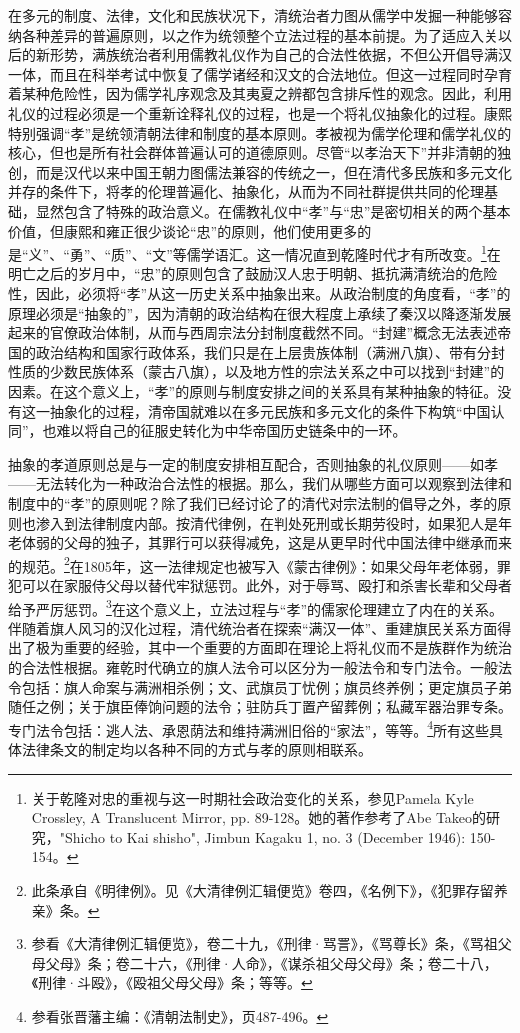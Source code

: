 \documentclass[a4paper, 12pt, openright]{ctexbook}
\begin{document}
在多元的制度、法律，文化和民族状况下，清统治者力图从儒学中发掘一种能够容纳各种差异的普遍原则，以之作为统领整个立法过程的基本前提。为了适应入关以后的新形势，满族统治者利用儒教礼仪作为自己的合法性依据，不但公开倡导满汉一体，而且在科举考试中恢复了儒学诸经和汉文的合法地位。但这一过程同时孕育着某种危险性，因为儒学礼序观念及其夷夏之辨都包含排斥性的观念。因此，利用礼仪的过程必须是一个重新诠释礼仪的过程，也是一个将礼仪抽象化的过程。康熙特别强调“孝”是统领清朝法律和制度的基本原则。孝被视为儒学伦理和儒学礼仪的核心，但也是所有社会群体普遍认可的道德原则。尽管“以孝治天下”并非清朝的独创，而是汉代以来中国王朝力图儒法兼容的传统之一，但在清代多民族和多元文化并存的条件下，将孝的伦理普遍化、抽象化，从而为不同社群提供共同的伦理基础，显然包含了特殊的政治意义。在儒教礼仪中“孝”与“忠”是密切相关的两个基本价值，但康熙和雍正很少谈论“忠”的原则，他们使用更多的是“义”、“勇”、“质”、“文”等儒学语汇。这一情况直到乾隆时代才有所改变。\footnote{关于乾隆对忠的重视与这一时期社会政治变化的关系，参见Pamela Kyle Crossley, A Translucent Mirror, pp. 89-128。她的著作参考了Abe Takeo的研究，"Shicho to Kai shisho", Jimbun Kagaku 1, no. 3 (December 1946): 150-154。}在明亡之后的岁月中，“忠”的原则包含了鼓励汉人忠于明朝、抵抗满清统治的危险性，因此，必须将“孝”从这一历史关系中抽象出来。从政治制度的角度看，“孝”的原理必须是“抽象的”，因为清朝的政治结构在很大程度上承续了秦汉以降逐渐发展起来的官僚政治体制，从而与西周宗法分封制度截然不同。“封建”概念无法表述帝国的政治结构和国家行政体系，我们只是在上层贵族体制（满洲八旗）、带有分封性质的少数民族体系（蒙古八旗），以及地方性的宗法关系之中可以找到“封建”的因素。在这个意义上，“孝”的原则与制度安排之间的关系具有某种抽象的特征。没有这一抽象化的过程，清帝国就难以在多元民族和多元文化的条件下构筑“中国认同”，也难以将自己的征服史转化为中华帝国历史链条中的一环。

抽象的孝道原则总是与一定的制度安排相互配合，否则抽象的礼仪原则——如孝——无法转化为一种政治合法性的根据。那么，我们从哪些方面可以观察到法律和制度中的“孝”的原则呢？除了我们已经讨论了的清代对宗法制的倡导之外，孝的原则也渗入到法律制度内部。按清代律例，在判处死刑或长期劳役时，如果犯人是年老体弱的父母的独子，其罪行可以获得减免，这是从更早时代中国法律中继承而来的规范。\footnote{此条承自《明律例》。见《大清律例汇辑便览》卷四，《名例下》，《犯罪存留养亲》条。}在1805年，这一法律规定也被写入《蒙古律例》：如果父母年老体弱，罪犯可以在家服侍父母以替代牢狱惩罚。此外，对于辱骂、殴打和杀害长辈和父母者给予严厉惩罚。\footnote{参看《大清律例汇辑便览》，卷二十九，《刑律·骂詈》，《骂尊长》条，《骂祖父母父母》条；卷二十六，《刑律·人命》，《谋杀祖父母父母》条；卷二十八，《刑律·斗殴》，《殴祖父母父母》条；等等。}在这个意义上，立法过程与“孝”的儒家伦理建立了内在的关系。伴随着旗人风习的汉化过程，清代统治者在探索“满汉一体”、重建旗民关系方面得出了极为重要的经验，其中一个重要的方面即在理论上将礼仪而不是族群作为统治的合法性根据。雍乾时代确立的旗人法令可以区分为一般法令和专门法令。一般法令包括：旗人命案与满洲相杀例；文、武旗员丁忧例；旗员终养例；更定旗员子弟随任之例；关于旗臣俸饷问题的法令；驻防兵丁置产留葬例；私藏军器治罪专条。专门法令包括：逃人法、承恩荫法和维持满洲旧俗的“家法”，等等。\footnote{参看张晋藩主编：《清朝法制史》，页487-496。}所有这些具体法律条文的制定均以各种不同的方式与孝的原则相联系。
\end{document}
